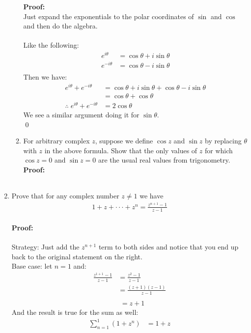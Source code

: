 \begin{enumerate}
\begin{enumerate}
		\textbf{Proof:} \\
		Just expand the exponentials to the polar coordinates of $\sin$ and $\cos$ and then do the algebra. \\
		\\
		Like the following:
		\begin{align*}
			e^{i\theta} &= \cos\theta + i\sin\theta \\
			e^{-i\theta} &= \cos\theta - i\sin\theta \\
		\end{align*}
		Then we have:
		\begin{align*}
			e^{i\theta} + e^{-i\theta} &= \cos\theta + i\sin\theta + \cos\theta - i\sin\theta \\
			&= \cos\theta + \cos\theta \\
			\therefore \; e^{i\theta} + e^{-i\theta} &= 2\cos\theta
		\end{align*}
		We see a similar argument doing it for $\sin\theta.$ \\
		\qed
	

		\item For arbitrary complex $z$, suppose we define $\cos{z}$ and $\sin{z}$ by replacing $\theta$ with $z$ in the above formula. Show that the only values of $z$ for which $\cos{z} = 0$ and $\sin{z} = 0$ are the usual real values from trigonometry. \\
		
		\textbf{Proof:} \\
		\\
	\end{enumerate}

	\item Prove that for any complex number $z \neq 1$ we have
	\begin{align*}
		1 + z + \cdot\cdot\cdot + z^n = \frac{z^{n + 1} - 1}{z - 1} \\
	\end{align*}
	
	\textbf{Proof:} \\
	\\
	Strategy: Just add the $z^{n + 1}$ term to both sides and notice that you end up back to the original statement on the right. \\

	Base case: let $n = 1$ and:
	\begin{align*}
		\frac{z^{1 + 1} - 1}{z -1} &= \frac{z^2 - 1}{z - 1} \\
		&= \frac{(z + 1)(z - 1)}{z - 1} \\
	\end{align*}
	\begin{align}
		&= z + 1
	\end{align}
	And the result is true for the sum as well:
	\begin{align}
		\sum_{n = 1}^{1} (1 + z^n) &= 1 + z
	\end{align}


\end{enumerate}
